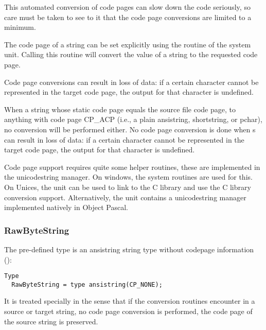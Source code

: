 This automated conversion of code pages can slow down the code seriously, so care must be 
taken to see to it that the code page conversions are limited to a minimum.



The code page of a string can be set explicitly using the  routine of the system unit.
Calling this routine will convert the value of a string to the requested code page.

\begin{remark}
Code page conversions can result in loss of data: if a certain character cannot be represented in the target 
code page, the output for that character is undefined.
\end{remark}

\begin{remark}
When a string whose static code page equals the source file code page, to anything with
code page CP\_ACP (i.e., a plain ansistring, shortstring, or pchar), no conversion will
be performed either.
No code page conversion is done when 
s can result in loss of data: if a certain character cannot be represented in the target 
code page, the output for that character is undefined.
\end{remark}

\begin{remark}
Code page support requires quite some helper routines, these are implemented in the unicodestring manager. 
On windows, the system routines are used for this. On Unices, the  unit can be used to link 
to the C library and use the C library conversion support. 
Alternatively, the  unit contains a unicodestring manager implemented natively in Object Pascal.
\end{remark}


\subsubsection{RawByteString}
The pre-defined  type is an ansistring string type without codepage information ():
\begin{verbatim}
Type
  RawByteString = type ansistring(CP_NONE);
\end{verbatim}
It is treated specially in the sense that if the conversion routines encounter  in a
source or target string, no code page conversion is performed, the code page of the source string is preserved.

